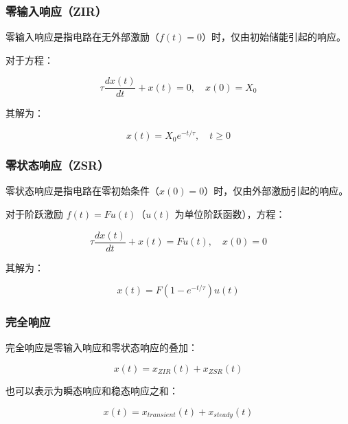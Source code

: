 \subsubsection{零输入响应（ZIR）}

零输入响应是指电路在无外部激励（$f(t) = 0$）时，仅由初始储能引起的响应。

对于方程：

\begin{equation}
\tau \frac{dx(t)}{dt} + x(t) = 0, \quad x(0) = X_0
\end{equation}

其解为：

\begin{equation}
x(t) = X_0 e^{-t/\tau}, \quad t \geq 0 \label{eq:zero-input-response}
\end{equation}

\subsubsection{零状态响应（ZSR）}

零状态响应是指电路在零初始条件（$x(0) = 0$）时，仅由外部激励引起的响应。

对于阶跃激励 $f(t) = F u(t)$（$u(t)$ 为单位阶跃函数），方程：

\begin{equation}
\tau \frac{dx(t)}{dt} + x(t) = F u(t), \quad x(0) = 0
\end{equation}

其解为：

\begin{equation}
x(t) = F (1 - e^{-t/\tau}) u(t) \label{eq:zero-state-response}
\end{equation}

\subsubsection{完全响应}

完全响应是零输入响应和零状态响应的叠加：

\begin{equation}
x(t) = x_{ZIR}(t) + x_{ZSR}(t) \label{eq:complete-response}
\end{equation}

也可以表示为瞬态响应和稳态响应之和：

\begin{equation}
x(t) = x_{transient}(t) + x_{steady}(t) \label{eq:transient-steady}
\end{equation}

